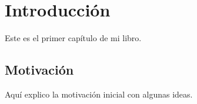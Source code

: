 \chapter{Introducción}
Este es el primer capítulo de mi libro.

\section{Motivación}
Aquí explico la motivación inicial con algunas ideas.
